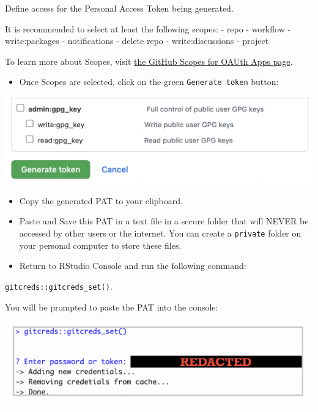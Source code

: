 \documentclass[
]{book}
\providecommand{\tightlist}{%
  \setlength{\itemsep}{0pt}\setlength{\parskip}{0pt}}
\begin{document}
Define access for the Personal Access Token being generated.

It is recommended to select at least the following scopes:
- repo
- workflow
- write:packages
- notifications
- delete repo
- write:discussions
- project

To learn more about Scopes, visit \href{https://docs.github.com/en/developers/apps/building-oauth-apps/scopes-for-oauth-apps}{the GitHub Scopes for OAUth Apps page}.

\begin{itemize}
\tightlist
\item
  Once Scopes are selected, click on the green \texttt{Generate\ token} button:
\end{itemize}

\begin{center}\includegraphics[width=14.72in]{images/generatepat} \end{center}

\begin{itemize}
\item
  Copy the generated PAT to your clipboard.
\item
  Paste and Save this PAT in a text file in a secure folder that will NEVER be accessed by other users or the internet. You can create a \texttt{private} folder on your personal computer to store these files.
\item
  Return to RStudio Console and run the following command:
\end{itemize}

\texttt{gitcreds::gitcreds\_set()}.

You will be prompted to paste the PAT into the console:

\begin{center}\includegraphics[width=14.42in]{images/paste_pat} \end{center}
\end{document}
